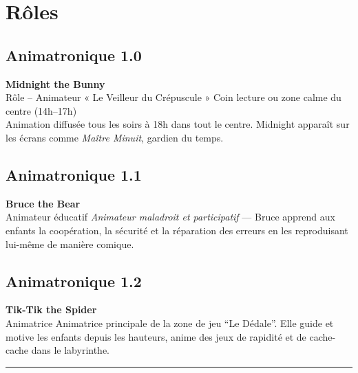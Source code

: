 \section{Rôles} %

\subsection{Animatronique 1.0}
\large\textbf{Midnight the Bunny} \\
\large{Rôle – Animateur « Le Veilleur du Crépuscule »}
Coin lecture ou zone calme du centre (14h–17h)\\
Animation diffusée tous les soirs à 18h dans tout le centre. Midnight apparaît sur les écrans comme \textit{Maître Minuit}, gardien du temps.

\subsection{Animatronique 1.1}
\large \textbf{Bruce the Bear} \\
\large{Animateur éducatif}
\textit{Animateur maladroit et participatif} — Bruce apprend aux enfants la coopération, la sécurité et la réparation des erreurs en les reproduisant lui-même de manière comique.

\subsection{Animatronique 1.2}
\large \textbf{Tik-Tik the Spider} \\
\large{Animatrice}
Animatrice principale de la zone de jeu “Le Dédale”. Elle guide et motive les enfants depuis les hauteurs, anime des jeux de rapidité et de cache-cache dans le labyrinthe.

\vfill
\hrule
